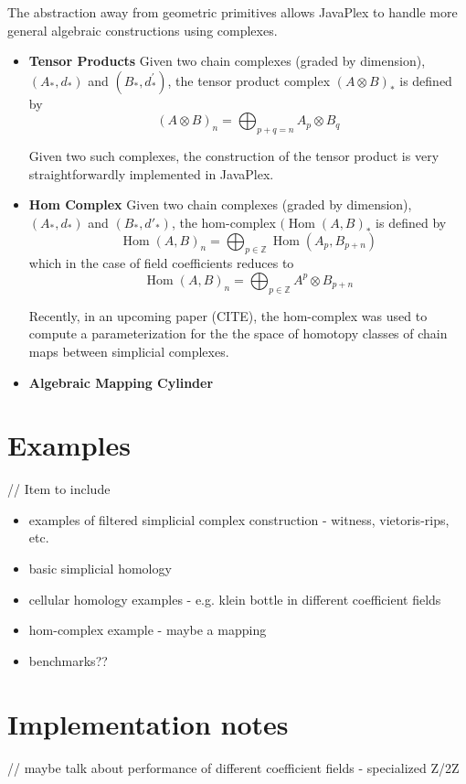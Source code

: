 \documentclass[10pt]{article}
\newcommand{\Hom}{\operatorname{Hom}}
\begin{document}
The abstraction away from geometric primitives allows JavaPlex to handle more general algebraic constructions using complexes.

\begin{itemize}
\item {\bf Tensor Products} Given two chain complexes (graded by dimension), $(A_*, d_*)$ and $(B_*, d^{\prime}_*)$, the tensor product complex $(A \otimes B)_*$ is defined by
$$(A \otimes B)_n = \bigoplus_{p + q = n} A_p \otimes B_q$$

Given two such complexes, the construction of the tensor product is very straightforwardly implemented in JavaPlex. 

\item {\bf Hom Complex} Given two chain complexes (graded by dimension), $(A_*, d_*)$ and $(B_*, d\prime_*)$, the hom-complex $(\Hom(A,B)_*$ is defined by
$$\Hom(A, B)_n = \bigoplus_{p \in \mathbb{Z}} \Hom(A_p, B_{p + n})$$
which in the case of field coefficients reduces to 
$$\Hom(A, B)_n = \bigoplus_{p \in \mathbb{Z}} A^p \otimes B_{p + n}$$

Recently, in an upcoming paper (CITE), the hom-complex was used to compute a parameterization for the the space of homotopy classes of chain maps between simplicial complexes.

\item {\bf Algebraic Mapping Cylinder}

\end{itemize}

\section{Examples}

// Item to include

\begin{itemize}
\item examples of filtered simplicial complex construction - witness, vietoris-rips, etc.
\item basic simplicial homology
\item cellular homology examples - e.g. klein bottle in different coefficient fields
\item hom-complex example - maybe a mapping
\item benchmarks??
\end{itemize}

\section{Implementation notes}

// maybe talk about performance of different coefficient fields - specialized Z/2Z 



\end{document}
